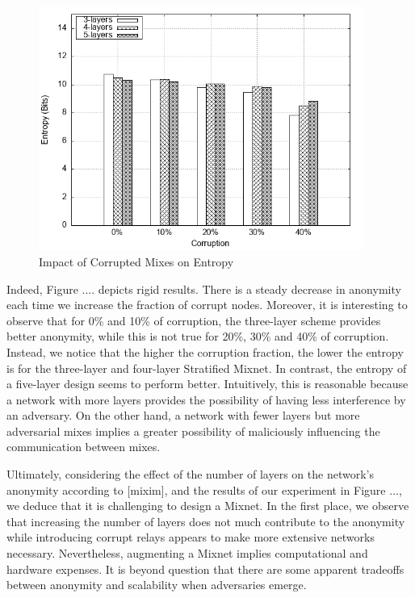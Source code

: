 \documentclass[logo,msc,cyber]{infthesis}   %
\begin{document}
\begin{figure}[h!]
    \centering
    \includegraphics[height=8cm]{figures/mixim/4.png}
    \caption{Impact of Corrupted Mixes on Entropy}
    \label{fig:corrupted-mixes}
 \end{figure}

Indeed, Figure .... depicts rigid results. There is a steady decrease in
anonymity each time we increase the fraction of corrupt nodes. Moreover, it is
interesting to observe that for 0\% and 10\% of corruption, the three-layer scheme
provides better anonymity, while this is not true for 20\%, 30\% and 40\% of
corruption. Instead, we notice that the higher the corruption fraction, the
lower the entropy is for the three-layer and four-layer Stratified Mixnet. In
contrast, the entropy of a five-layer design seems to perform better.
Intuitively, this is reasonable because a network with more layers provides the
possibility of having less interference by an adversary. On the other hand, a
network with fewer layers but more adversarial mixes implies a greater
possibility of maliciously influencing the communication between mixes.

Ultimately, considering the effect of the number of layers on the network's
anonymity according to [mixim], and the results of our experiment in Figure ...,
we deduce that it is challenging to design a Mixnet. In the first place, we
observe that increasing the number of layers does not much contribute to the
anonymity while introducing corrupt relays appears to make more extensive
networks necessary. Nevertheless, augmenting a Mixnet implies computational and
hardware expenses. It is beyond question that there are some apparent tradeoffs
between anonymity and scalability when adversaries emerge.
\end{document}
